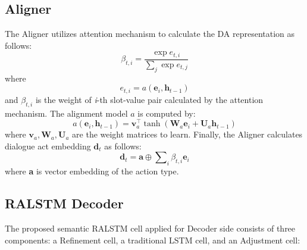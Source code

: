 \documentclass[11pt,a4paper]{article}
\begin{document}
\subsection{Aligner}\label{subsec:aligner}
The Aligner utilizes attention mechanism to calculate the DA representation as follows:
\begin{equation}
\beta_{t,i} = \frac{\exp e_{t,i} }{\sum\nolimits_{j}\exp e_{t,j}}
\end{equation}
where
\begin{equation}
e_{t,i}=a(\textbf{e}_{i}, \textbf{h}_{t-1})
\end{equation}
and  $\beta_{t,i}$ is the weight of \textit{i}-th slot-value pair calculated by the attention mechanism. The alignment model $a$ is computed by:
\begin{equation}\label{eq:alignment-a}
a(\textbf{e}_{i}, \textbf{h}_{t-1}) = \textbf{v}_{a}^{\top}\tanh(\textbf{W}_{a}\textbf{e}_{i} + \textbf{U}_{a}\textbf{h}_{t-1})
\end{equation}
where $\textbf{v}_{a}, \textbf{W}_{a}, \textbf{U}_{a}$ are the weight matrices to learn.
Finally, the Aligner calculates dialogue act embedding $\textbf{d}_{t}$ as follows:
\begin{equation}\label{eq:d-t}
\textbf{d}_{t} = \textbf{a} \oplus \sum\nolimits_{i}\beta_{t,i} \textbf{e}_{i}
\end{equation} 
where \textbf{a} is vector embedding of the action type.

\subsection{RALSTM Decoder}\label{subsec:ralstm}
The proposed semantic RALSTM cell applied for Decoder side consists of three components: a Refinement cell, a traditional LSTM cell, and an Adjustment cell:
\end{document}
